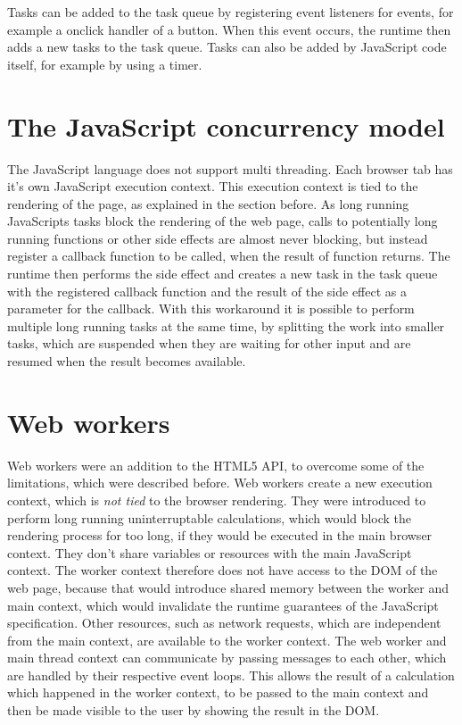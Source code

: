 \documentclass[
	ruledheaders=section,%
	class=report,%
	thesis={type=bachelor},%
	accentcolor=9c,%
	custommargins=true,%
	marginpar=false,%
	parskip=half-,%
	fontsize=11pt,%
]{tudapub}
\begin{document}
  Tasks can be added to the task queue by registering event listeners for events, for example a onclick handler of a button. When this event occurs, the runtime then adds a new tasks to the task queue. Tasks can also be added by JavaScript code itself, for example by using a timer.

  
  \section{The JavaScript concurrency model}
  
  The JavaScript language does not support multi threading. Each browser tab has it's own JavaScript execution context. This execution context is tied to the rendering of the page, as explained in the section before. As long running JavaScripts tasks block the rendering of the web page, calls to potentially long running functions or other side effects are almost never blocking, but instead register a callback function to be called, when the result of function returns. The runtime then performs the side effect and creates a new task in the task queue with the registered callback function and the result of the side effect as a parameter for the callback. With this workaround it is possible to perform multiple long running tasks at the same time, by splitting the work into smaller tasks, which are suspended when they are waiting for other input and are resumed when the result becomes available.
  
  
  \section{Web workers}

  Web workers were an addition to the HTML5 API, to overcome some of the limitations, which were described before. Web workers create a new execution context, which is \textit{not tied} to the browser rendering. They were introduced to perform long running uninterruptable calculations, which would block the rendering process for too long, if they would be executed in the main browser context. They don't share variables or resources with the main JavaScript context. The worker context therefore does not have access to the DOM of the web page, because that would introduce shared memory between the worker and main context, which would invalidate the runtime guarantees of the JavaScript specification. Other resources, such as network requests, which are independent from the main context, are available to the worker context. The web worker and main thread context can communicate by passing messages to each other, which are handled by their respective event loops. This allows the result of a calculation which happened in the worker context, to be passed to the main context and then be made visible to the user by showing the result in the DOM.
\end{document}
